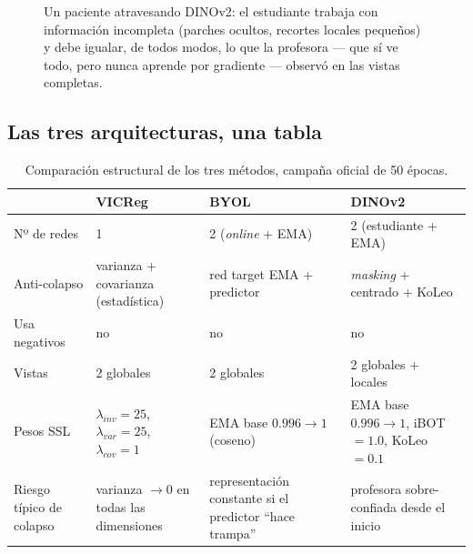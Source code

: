 \documentclass[11pt,a4paper]{article}
\begin{document}
\begin{figure}[htbp]
\caption{Un paciente atravesando DINOv2: el estudiante trabaja con
información incompleta (parches ocultos, recortes locales pequeños) y debe
igualar, de todos modos, lo que la profesora --- que sí ve todo, pero nunca
aprende por gradiente --- observó en las vistas completas.}
\label{fig:dinov2}
\end{figure}

\subsection{Las tres arquitecturas, una tabla}

\begin{table}[htbp]
\centering
\small
\begin{tabular}{p{2.1cm}p{3.4cm}p{3.4cm}p{3.6cm}}
\toprule
 & \textbf{VICReg} & \textbf{BYOL} & \textbf{DINOv2} \\
\midrule
Nº de redes & 1 & 2 (\emph{online} + EMA) & 2 (estudiante + EMA) \\
Anti-colapso & varianza + covarianza (estadística) & red target EMA + predictor & \emph{masking} + centrado + KoLeo \\
Usa negativos & no & no & no \\
Vistas & 2 globales & 2 globales & 2 globales + locales \\
Pesos SSL & $\lambda_{inv}{=}25$, $\lambda_{var}{=}25$, $\lambda_{cov}{=}1$ & EMA base $0.996\to1$ (coseno) & EMA base $0.996\to1$, iBOT $=1.0$, KoLeo $=0.1$ \\
Riesgo típico de colapso & varianza $\to0$ en todas las dimensiones & representación constante si el predictor ``hace trampa'' & profesora sobre-confiada desde el inicio \\
\bottomrule
\end{tabular}
\caption{Comparación estructural de los tres métodos, campaña oficial de 50 épocas.}
\label{tab:overview}
\end{table}
\end{document}
